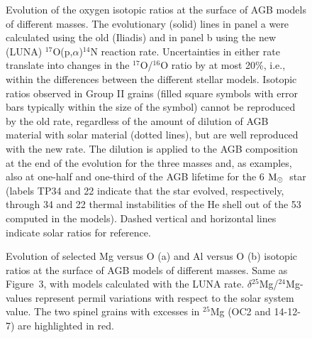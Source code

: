 \documentclass{nature}
\newcommand{\iso}[2]{\hbox{${}^{#1}${#2}}}
\newcommand{\msun}{\ensuremath{{\rm M}_{\odot}}}
\begin{document}
\begin{figure} 
\caption{
Evolution of the oxygen isotopic ratios at the surface of AGB models of different masses. 
The evolutionary (solid)  
lines in panel a were calculated using the old (Iliadis\cite{iliadis10}) and in panel b 
using the new 
(LUNA\cite{bruno16}) \iso{17}O(p,$\alpha$)\iso{14}N reaction rate. Uncertainties in 
either rate translate into changes in the \iso{17}O/\iso{16}O ratio 
by at most 20\%, i.e., within the differences 
between the different stellar models. Isotopic ratios observed in Group II grains (filled square 
symbols\cite{hynes09} with error bars typically within the size of the symbol) 
cannot be reproduced by the old rate, regardless of the amount of dilution of AGB material 
with solar material (dotted lines), but are well reproduced with the new rate.  
The dilution is applied to the AGB composition at the end of the 
evolution for the three masses and, as examples, also   
at one-half and one-third of the AGB lifetime for the 6 \msun\ star (labels TP34 
and 22 indicate that the star evolved, respectively, through 34 and 22 thermal instabilities 
of the He shell out of the 53 
computed in the models). Dashed vertical and horizontal lines indicate solar ratios for 
reference.
\label{fig:IliadisLUNA}}
\end{figure}

\begin{figure}
\caption{Evolution of selected Mg versus O (a) and Al versus O (b) 
isotopic ratios at the surface of AGB models of different masses.
Same as Figure~3, with models calculated with the LUNA rate.  
$\delta$\iso{25}Mg/\iso{24}Mg-values represent permil variations with respect to the solar
system value. The two spinel grains with excesses in \iso{25}Mg
(OC2 and 14-12-7) are highlighted in red.
\label{fig:mg25mg26}}
\end{figure}
\end{document}
